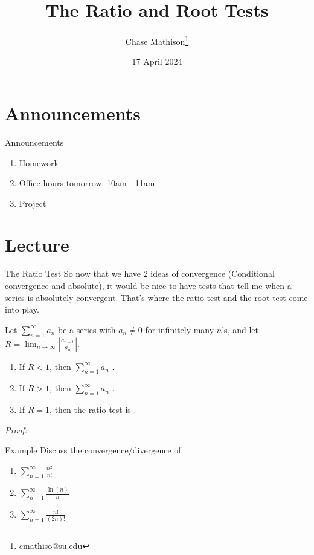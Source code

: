\documentclass[presentation]{beamer}
\institute[SU]{Shenandoah University}
\author{Chase Mathison\thanks{cmathiso@su.edu}}
\date{17 April 2024}
\title{The Ratio and Root Tests}
\begin{document}
\maketitle

\section{Announcements}
\label{sec:org64c7a17}
\begin{frame}[label={sec:org2678b9d}]{Announcements}
\begin{enumerate}
\item Homework
\item Office hours tomorrow: 10am - 11am
\item Project
\end{enumerate}
\end{frame}

\section{Lecture}
\label{sec:orgb15f005}
\begin{frame}[label={sec:org158cc50}]{The Ratio Test}
So now that we have 2 ideas of convergence (Conditional convergence
and absolute), it would be nice to have tests that tell me when a
series is absolutely convergent.  That's where the ratio test and the root test come into play.

\begin{theorem}
Let \(\sum\limits_{n=1}^{\infty} a_n\) be a series with \(a_n \neq 0\) for infinitely
many \(n\)'s, and let \(R = \lim_{n\rightarrow \infty} \left| \frac{a_{n+1}}{a_n} \right|.\)
\begin{enumerate}
\item If \(R < 1\), then \(\sum\limits_{n=1}^{\infty} a_n\) \uline{\hspace*{2in}}.
\item If \(R > 1\), then \(\sum\limits_{n=1}^{\infty} a_n\) \uline{\hspace*{1in}}.
\item If \(R = 1\), then the ratio test is \uline{\hspace*{1in}}.
\end{enumerate}
\end{theorem}

\emph{Proof:}
\vspace{10in}
\end{frame}

\begin{frame}[label={sec:org1e21338}]{Example}
Discuss the convergence/divergence of
\begin{enumerate}
\item \(\sum\limits_{n=1}^{\infty} \frac{n^2}{n!}\)
\item \(\sum\limits_{n=1}^{\infty} \frac{\ln(n)}{n}\)
\item \(\sum\limits_{n=1}^{\infty} \frac{n!}{\left( 2n \right)!}\)
\end{enumerate}

\vspace{10in}
\end{frame}
\end{document}

